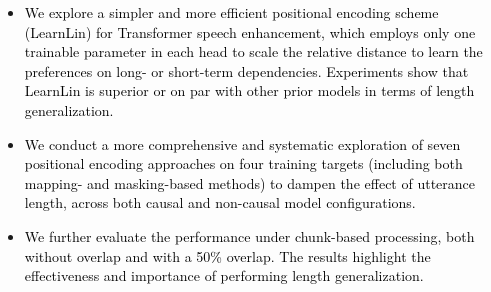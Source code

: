 \documentclass[journal]{IEEEtran}
\newcommand{\qian}[1]{{\color{magenta}#1}}
\begin{document}

\begin{itemize}
    \item \textcolor{black}{We explore a simpler and more efficient positional encoding scheme (LearnLin) for Transformer speech enhancement, which employs only one trainable parameter in each head to scale the relative distance to learn the preferences on long- or short-term dependencies. Experiments show that LearnLin is superior or on par with other prior models in terms of length generalization.}
    
    \item \textcolor{black}{We conduct a more comprehensive and systematic exploration of seven positional encoding approaches on four training targets (including both mapping- and masking-based methods) to dampen the effect of utterance length, across both causal and non-causal model configurations. 
    }
    \item \textcolor{black}{We further evaluate the performance under chunk-based processing, both without overlap and with a 50\% overlap. The results highlight the effectiveness and importance of performing length generalization.}
\end{itemize}
\end{document}
